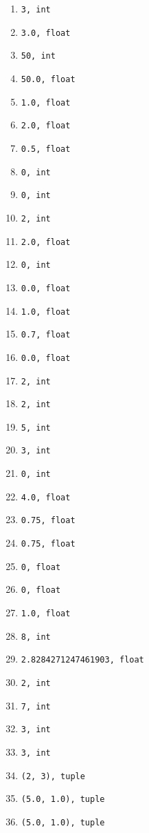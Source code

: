 \documentclass[a4paper]{article}
\begin{document}
\begin{multicols}{3}
\begin{enumerate}[label=\arabic*.]
    \item \verb|3, int|
    \item \verb|3.0, float|
    \item \verb|50, int|
    \item \verb|50.0, float|
    \item \verb|1.0, float|
    \item \verb|2.0, float|
    \item \verb|0.5, float|
    \item \verb|0, int|
    \item \verb|0, int|
    \item \verb|2, int|
    \item \verb|2.0, float|
    \item \verb|0, int|
    \item \verb|0.0, float|
    \item \verb|1.0, float|
    \item \verb|0.7, float|
    \item \verb|0.0, float|
    \item \verb|2, int|
    \item \verb|2, int|

    \item \verb|5, int|
    \item \verb|3, int|
    \item \verb|0, int|
    \item \verb|4.0, float|
    \item \verb|0.75, float|
    \item \verb|0.75, float|
    \item \verb|0, float|
    \item \verb|0, float|

    \item \verb|1.0, float|

    \item \verb|8, int|
    \item \verb|2.8284271247461903, float|
    \item \verb|2, int|
    \item \verb|7, int|
    \item \verb|3, int|
    \item \verb|3, int|
    \item \verb|(2, 3), tuple|
    \item \verb|(5.0, 1.0), tuple|
    \item \verb|(5.0, 1.0), tuple|

\end{enumerate}
\end{multicols}
\end{document}
